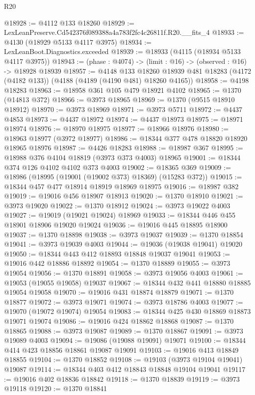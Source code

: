 \begin{lexlean}{R20}
\begin{coremodule}
@18928 := @4112 @133 @18260
@18929 := LexLeanPreserve.Cd542376f089388a4a783f2fc4c26811f.R20.__fits_4
@18933 := @4130 (@18929 @5133 @4117 @3975)
@18934 := LexLeanBoot.Diagnostics.exceeded
@18939 := @18933 (@4115 (@18934 @5133 @4117 @3975))
@18943 := (phase : @4074) -> (limit : @16) -> (observed : @16) -> @18928 @18939
@18957 := @4148
    @133
    @18260
    @18939
    @481
    @18283
    (@4172 (@4182 @133))
    (@4188 (@4189 (@4190 @481) @18260 @4165))
@18958 := @4198 @18283
@18963 := @18958 @361 @105 @479 @18921 @4102
@18965 := @1370 (@14813 @372)
@18966 := @3973 @18965
@18969 := @1370 (@9515 @18910 @18912)
@18970 := @3973 @18969
@18971 := @3973 @5711
@18972 := @4437 @4853
@18973 := @4437 @18972
@18974 := @4437 @18973
@18975 := @18971 @18974
@18976 := @18970 @18975
@18977 := @18966 @18976
@18980 := @18963 @18977 (@3972 @18977)
@18986 := @18344 @377 @478 @18820 @18920 @18965 @18976
@18987 := @4426 @18283
@18988 := @18987 @367
@18995 := @18988 @376 @4104 @18819 (@3973 @373 @4003) @18965
@19001 := @18344 @374 @126 @4102 @4102 @373 @4003
@19002 := @18365 @369
@19009 := @18986 (@18995 (@19001 (@19002 @373) @18369) (@15283 @372))
@19015 := @18344 @457 @477 @18914 @18919 @18969 @18975
@19016 := @18987 @382
@19019 := @19016 @456 @18907 @18913
@19020 := @1370 @18910
@19021 := @3973 @19020
@19022 := @1370 @18912
@19024 := @3973 @19022 @4003
@19027 := @19019 (@19021 @19024) @18969
@19033 := @18344 @446 @455 @18901 @18906 @19020 @19024
@19036 := @19016 @445 @18895 @18900
@19037 := @1370 @18898
@19038 := @3973 @19037
@19039 := @1370 @18854
@19041 := @3973 @19039 @4003
@19044 := @19036 (@19038 @19041) @19020
@19050 := @18344 @443 @412 @18893 @18848 @19037 @19041
@19053 := @19016 @442 @18886 @18892
@19054 := @1370 @18889
@19055 := @3973 @19054
@19056 := @1370 @18891
@19058 := @3973 @19056 @4003
@19061 := @19053 (@19055 @19058) @19037
@19067 := @18344 @432 @441 @18880 @18885 @19054 @19058
@19070 := @19016 @431 @18874 @18879
@19071 := @1370 @18877
@19072 := @3973 @19071
@19074 := @3973 @18786 @4003
@19077 := @19070 (@19072 @19074) @19054
@19083 := @18344 @425 @430 @18869 @18873 @19071 @19074
@19086 := @19016 @424 @18862 @18868
@19087 := @1370 @18865
@19088 := @3973 @19087
@19089 := @1370 @18867
@19091 := @3973 @19089 @4003
@19094 := @19086 (@19088 @19091) @19071
@19100 := @18344 @414 @423 @18856 @18861 @19087 @19091
@19103 := @19016 @413 @18849 @18855
@19104 := @1370 @18852
@19108 := @19103 (@3973 @19104 @19041) @19087
@19114 := @18344 @403 @412 @18843 @18848 @19104 @19041
@19117 := @19016 @402 @18836 @18842
@19118 := @1370 @18839
@19119 := @3973 @19118
@19120 := @1370 @18841

\end{coremodule}
\end{lexlean}
